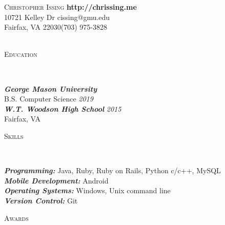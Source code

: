 \documentclass[9pt]{article}
\newenvironment{changemargin}[2]{%
  \begin{list}{}{%
    \setlength{\topsep}{0pt}%
    \setlength{\leftmargin}{#1}%
    \setlength{\rightmargin}{#2}%
    \setlength{\listparindent}{\parindent}%
    \setlength{\itemindent}{\parindent}%
    \setlength{\parsep}{\parskip}%
  }%
  \item[]}{\end{list}
}
\newcommand{\lineover}{
	\begin{changemargin}{-0.05in}{-0.05in}
		\vspace*{-8pt}
		\hrulefill \\
		\vspace*{-2pt}
	\end{changemargin}
}
\newcommand{\header}[1]{
	\begin{changemargin}{-0.5in}{-0.5in}
		\scshape{#1}\\
  	\lineover
	\end{changemargin}
}
\newcommand{\contact}[8]{
	\begin{changemargin}{-0.5in}{-0.5in}
		\begin{flushleft}
			{\Large \scshape {#1}} \hfill \textbf {#5}\\ \smallskip
			{#2} \hfill {#6}\\ \smallskip 
			{#3}\hfill {#7}\\ \smallskip
			{#4}\hfill {#8}\\\smallskip
		\end{flushleft}
	\end{changemargin}
}
\newenvironment{body} {
	\vspace*{-10pt}
	\begin{changemargin}{-0.25in}{-0.5in}
  }	
	{\end{changemargin}
}
\begin{document}
\contact{Christopher Issing}{10721 Kelley Dr}{Fairfax, VA 22030}{}{http://chrissing.me}{cissing@gmu.edu}{(703) 975-3828}{}


%
%
%
%


\header{Education}

\begin{body}
	\vspace{14pt}
	\textbf{\emph{George Mason University}{} }\\
	B.S. Computer Science  \hfill \emph{2019}{} \\
	\textbf{\emph{W.T. Woodson High School}{}} \hfill \emph{2015}{} \\
	Fairfax, VA
\end{body}

\smallskip


\header{Skills}

\begin{body}
	\vspace{14pt}
	\emph{\textbf{Programming:}}{} Java, Ruby, Ruby on Rails, Python c/c++, MySQL\\
	\smallskip
	\emph{\textbf{Mobile Development:}}{} Android \\
	\smallskip
	\emph{\textbf{Operating Systems:}}{} Windows, Unix command line\\
	\smallskip
	\emph{\textbf{Version Control:}}{} Git\\
\end{body}

\smallskip



\header{Awards}
\end{document}
